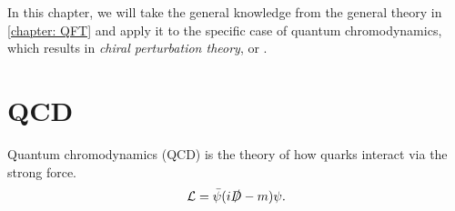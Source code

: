 In this chapter, we will take the general knowledge from the general theory in \autoref{chapter: QFT} and apply it to the specific case of quantum chromodynamics, which results in \emph{chiral perturbation theory}, or \chpt.

\section{QCD}

Quantum chromodynamics (QCD) is the theory of how quarks interact via the strong force.
%
\begin{equation}
    \mathcal{L} = \bar \psi (i \slashed D - m) \psi.
\end{equation}
%

